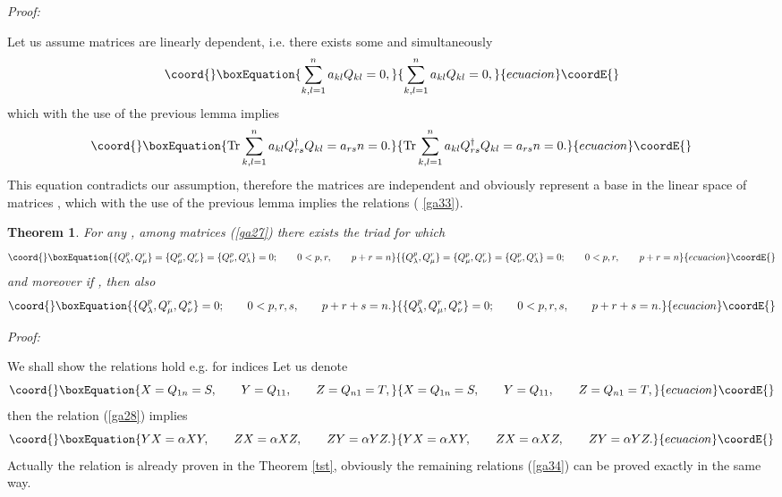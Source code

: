 \documentclass[a4paper,a4paper]{article}
\newtheorem{theorem}{Theorem}
\begin{document}
\noindent \textit{Proof:}

\noindent Let us assume matrices \coordHE{} are linearly dependent, i.e. there
exists some \coordHE{} and simultaneously%
\begin{equation*}\coord{}\boxEquation{
\sum_{k,l=1}^{n}a_{kl}Q_{kl}=0,
}{
\sum_{k,l=1}^{n}a_{kl}Q_{kl}=0,
}{ecuacion}\coordE{}\end{equation*}%
which with the use of the previous lemma implies%
\begin{equation*}\coord{}\boxEquation{
\text{\textrm{Tr}}\sum_{k,l=1}^{n}a_{kl}Q_{rs}^{\dagger }Q_{kl}=a_{rs}n=0.
}{
\text{\textrm{Tr}}\sum_{k,l=1}^{n}a_{kl}Q_{rs}^{\dagger }Q_{kl}=a_{rs}n=0.
}{ecuacion}\coordE{}\end{equation*}%
This equation contradicts our assumption, therefore the matrices are
independent and obviously represent a base in the linear space of matrices \coordHE{}, which with the use of the previous lemma implies the relations (%
\ref{ga33}).

\begin{theorem}
For any \coordHE{}, among \coordHE{} matrices (\ref{ga27}) there exists the triad \coordHE{} for which 
\begin{equation}\coord{}\boxEquation{  \label{ga34}
\{Q_\lambda ^p,Q_\mu ^r\}=\{Q_\mu ^p,Q_\nu ^r\}=\{Q_\nu ^p,Q_\lambda
^r\}=0;\qquad 0<p,r,\qquad p+r=n
}{  \{Q_\lambda ^p,Q_\mu ^r\}=\{Q_\mu ^p,Q_\nu ^r\}=\{Q_\nu ^p,Q_\lambda
^r\}=0;\qquad 0<p,r,\qquad p+r=n
}{ecuacion}\coordE{}\end{equation}
and moreover if \coordHE{}, then also 
\begin{equation}\coord{}\boxEquation{  \label{ga35}
\{Q_\lambda ^p,Q_\mu ^r,Q_\nu ^s\}=0;\qquad 0<p,r,s,\qquad p+r+s=n.
}{  \{Q_\lambda ^p,Q_\mu ^r,Q_\nu ^s\}=0;\qquad 0<p,r,s,\qquad p+r+s=n.
}{ecuacion}\coordE{}\end{equation}
\end{theorem}

\noindent \textit{Proof:}

\noindent We shall show the relations hold e.g. for indices \coordHE{} Let us denote 
\begin{equation}\coord{}\boxEquation{
X=Q_{1n}=S,\qquad Y=Q_{11},\qquad Z=Q_{n1}=T,  \label{ga35.1}
}{
X=Q_{1n}=S,\qquad Y=Q_{11},\qquad Z=Q_{n1}=T,  }{ecuacion}\coordE{}\end{equation}%
then the relation (\ref{ga28}) implies 
\begin{equation}\coord{}\boxEquation{
YX=\alpha XY,\qquad ZX=\alpha XZ,\qquad ZY=\alpha YZ.  \label{gaa35}
}{
YX=\alpha XY,\qquad ZX=\alpha XZ,\qquad ZY=\alpha YZ.  }{ecuacion}\coordE{}\end{equation}%
Actually the relation \myHighlight{$\{X^{p},Z^{r}\}=0$}\coordHE{} is already proven in the Theorem %
\ref{tst}, obviously the remaining relations (\ref{ga34}) can be proved
exactly in the same way.
\end{document}
